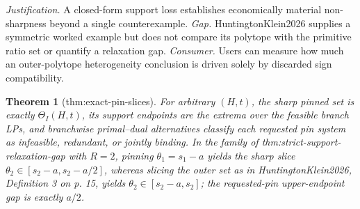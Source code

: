 \documentclass{article}
\newtheorem{theorem}{Theorem}
\begin{document}
\par\smallskip\noindent \textit{Justification.} A closed-form support loss establishes economically material non-sharpness beyond a single counterexample. \textit{Gap.} HuntingtonKlein2026 supplies a symmetric worked example but does not compare its polytope with the primitive ratio set or quantify a relaxation gap. \textit{Consumer.} Users can measure how much an outer-polytope heterogeneity conclusion is driven solely by discarded sign compatibility.

\begin{theorem}[thm:exact-pin-slices]\label{thm:exact-pin-slices}
For arbitrary \((H,t)\), the sharp pinned set is exactly \(\Theta_I(H,t)\), its support endpoints are the extrema over the feasible branch LPs, and branchwise primal--dual alternatives classify each requested pin system as infeasible, redundant, or jointly binding. In the family of thm:strict-support-relaxation-gap with \(R=2\), pinning \(\theta_1=s_1-a\) yields the sharp slice \(\theta_2\in[s_2-a,s_2-a/2]\), whereas slicing the outer set as in HuntingtonKlein2026, Definition 3 on p. 15, yields \(\theta_2\in[s_2-a,s_2]\); the requested-pin upper-endpoint gap is exactly \(a/2\).
\end{theorem}
\end{document}
